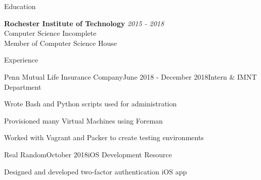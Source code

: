 \documentclass{resume} %
\begin{document}

\begin{rSection}{Education}

{\bf Rochester Institute of Technology} \hfill {\em 2015 - 2018} 
\\ Computer Science \hfill {Incomplete} \\
Member of Computer Science House \\

\end{rSection}

\begin{rSection}{Experience}

\begin{rSubsection}{Penn Mutual Life Insurance Company}{June 2018 - December 2018}{Intern \& IMNT Department}{}
\item Wrote Bash and Python scripts used for administration
\item Provisioned many Virtual Machines using Foreman 
\item Worked with Vagrant and Packer to create testing environments
\end{rSubsection}



\begin{rSubsection}{Real Random}{October 2018}{iOS Development Resource}{}
\item Designed and developed two-factor authentication iOS app
\end{rSubsection}

\end{rSection}


\end{document}
